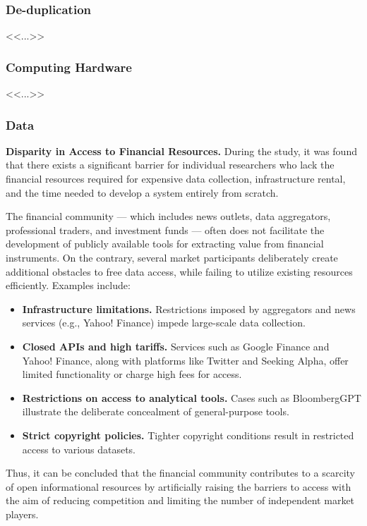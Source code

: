 \subsubsection{De-duplication}
<<...>>

\subsubsection{Computing Hardware}
<<...>>

\subsubsection{Data}
\textbf{Disparity in Access to Financial Resources.} During the study, it was found that there exists a significant barrier for individual
researchers who lack the financial resources required for expensive data collection, infrastructure rental, and the time needed to develop
a system entirely from scratch.

The financial community — which includes news outlets, data aggregators, professional traders, and investment funds — often does not facilitate
the development of publicly available tools for extracting value from financial instruments. On the contrary, several market participants deliberately
create additional obstacles to free data access, while failing to utilize existing resources efficiently. Examples include:

\begin{itemize}
    \item \textbf{Infrastructure limitations.} Restrictions imposed by aggregators and news services (e.g., Yahoo! Finance) impede large-scale data collection.
    \item \textbf{Closed APIs and high tariffs.} Services such as Google Finance and Yahoo! Finance, along with platforms like Twitter and Seeking Alpha,
    offer limited functionality or charge high fees for access.
    \item \textbf{Restrictions on access to analytical tools.} Cases such as BloombergGPT illustrate the deliberate concealment of general-purpose tools.
    \item \textbf{Strict copyright policies.} Tighter copyright conditions result in restricted access to various datasets.
\end{itemize}

Thus, it can be concluded that the financial community contributes to a scarcity of open informational resources by artificially raising
the barriers to access with the aim of reducing competition and limiting the number of independent market players.

